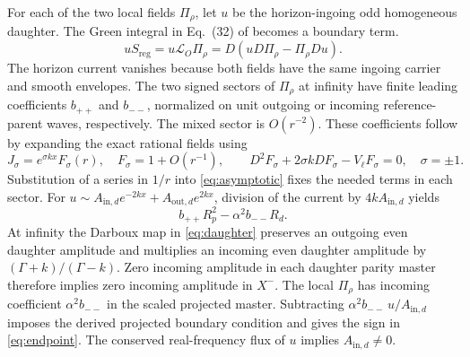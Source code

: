 \documentclass[11pt]{article}
\begin{document}
For each of the two local fields \(\Pi_\rho\), let \(u\) be the horizon-ingoing odd homogeneous daughter.
The Green integral in Eq.~(32) of \cite{bucciotti} becomes a boundary term.
\begin{equation}
 uS_{\mathrm{reg}}=u\mathcal L_O\Pi_\rho
 =D(uD\Pi_\rho-\Pi_\rho Du).
 \label{eq:current}
\end{equation}
The horizon current vanishes because both fields have the same ingoing carrier and smooth envelopes.
The two signed sectors of \(\Pi_\rho\) at infinity have finite leading coefficients \(b_{++}\) and \(b_{--}\), normalized on unit outgoing or incoming reference-parent waves, respectively.
The mixed sector is \(O(r^{-2})\).
These coefficients follow by expanding the exact rational fields using
\begin{equation}
 J_\sigma=e^{\sigma kx}F_\sigma(r),\quad
 F_\sigma=1+O(r^{-1}),\qquad
 D^2F_\sigma+2\sigma k DF_\sigma-V_\ell F_\sigma=0,\quad \sigma=\pm1 .
 \label{eq:asymptotic}
\end{equation}
Substitution of a series in \(1/r\) into \eqref{eq:asymptotic} fixes the needed terms in each sector.
For \(u\sim A_{\mathrm{in},d}e^{-2kx}+A_{\mathrm{out},d}e^{2kx}\), division of the current by \(4k A_{\mathrm{in},d}\) yields
\begin{equation}
  b_{++} R_p^2-\alpha^2 b_{--}R_d .
 \label{eq:endpoint}
\end{equation}
At infinity the Darboux map in \eqref{eq:daughter} preserves an outgoing even daughter amplitude and multiplies an incoming even daughter amplitude by \((\Gamma+k)/(\Gamma-k)\).
Zero incoming amplitude in each daughter parity master therefore implies zero incoming amplitude in \(X^-\).
The local \(\Pi_\rho\) has incoming coefficient \(\alpha^2 b_{--}\) in the scaled projected master. Subtracting \(\alpha^2 b_{--}\,u/A_{\mathrm{in},d}\) imposes the derived projected boundary condition and gives the sign in \eqref{eq:endpoint}.
The conserved real-frequency flux of \(u\) implies \(A_{\mathrm{in},d}\ne0\).
\end{document}
